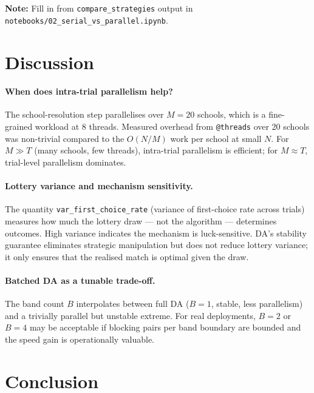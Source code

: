 \documentclass{article}
\theoremstyle{plain}
\theoremstyle{definition}
\theoremstyle{remark}
\begin{document}
\textbf{Note:} Fill in from \texttt{compare\_strategies} output in
\texttt{notebooks/02\_serial\_vs\_parallel.ipynb}.

\section{Discussion}
\label{sec:discussion}

\paragraph{When does intra-trial parallelism help?}
The school-resolution step parallelises over $M = 20$ schools, which is a
fine-grained workload at 8 threads. Measured overhead from
\texttt{@threads} over 20 schools was non-trivial compared to the
$O(N/M)$ work per school at small $N$. For $M \gg T$ (many schools,
few threads), intra-trial parallelism is efficient; for $M \approx T$,
trial-level parallelism dominates.

\paragraph{Lottery variance and mechanism sensitivity.}
The quantity \texttt{var\_first\_choice\_rate} (variance of first-choice
rate across trials) measures how much the lottery draw --- not the algorithm
--- determines outcomes. High variance indicates the mechanism is luck-sensitive.
DA's stability guarantee eliminates strategic manipulation but does not
reduce lottery variance; it only ensures that the realised match is optimal
given the draw.

\paragraph{Batched DA as a tunable trade-off.}
The band count $B$ interpolates between full DA ($B=1$, stable, less
parallelism) and a trivially parallel but unstable extreme. For real
deployments, $B=2$ or $B=4$ may be acceptable if blocking pairs per band
boundary are bounded and the speed gain is operationally valuable.

\section{Conclusion}
\label{sec:conclusion}
\end{document}
